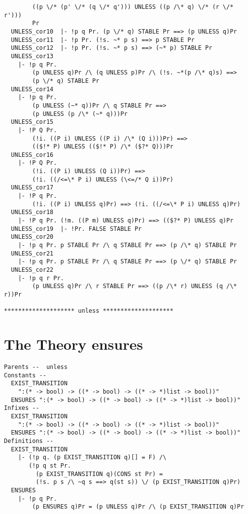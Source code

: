 {\begin{verbatim}
        ((p \/* (p' \/* (q \/* q'))) UNLESS ((p /\* q) \/* (r \/* r')))
        Pr
  UNLESS_cor10  |- !p q Pr. (p \/* q) STABLE Pr ==> (p UNLESS q)Pr
  UNLESS_cor11  |- !p Pr. (!s. ~* p s) ==> p STABLE Pr
  UNLESS_cor12  |- !p Pr. (!s. ~* p s) ==> (~* p) STABLE Pr
  UNLESS_cor13
    |- !p q Pr.
        (p UNLESS q)Pr /\ (q UNLESS p)Pr /\ (!s. ~*(p /\* q)s) ==>
        (p \/* q) STABLE Pr
  UNLESS_cor14
    |- !p q Pr.
        (p UNLESS (~* q))Pr /\ q STABLE Pr ==>
        (p UNLESS (p /\* (~* q)))Pr
  UNLESS_cor15
    |- !P Q Pr.
        (!i. ((P i) UNLESS ((P i) /\* (Q i)))Pr) ==>
        (($!* P) UNLESS (($!* P) /\* ($?* Q)))Pr
  UNLESS_cor16
    |- !P Q Pr.
        (!i. ((P i) UNLESS (Q i))Pr) ==>
        (!i. ((/<=\* P i) UNLESS (\<=/* Q i))Pr)
  UNLESS_cor17
    |- !P q Pr.
        (!i. ((P i) UNLESS q)Pr) ==> (!i. ((/<=\* P i) UNLESS q)Pr)
  UNLESS_cor18
    |- !P q Pr. (!m. ((P m) UNLESS q)Pr) ==> (($?* P) UNLESS q)Pr
  UNLESS_cor19  |- !Pr. FALSE STABLE Pr
  UNLESS_cor20
    |- !p q Pr. p STABLE Pr /\ q STABLE Pr ==> (p /\* q) STABLE Pr
  UNLESS_cor21
    |- !p q Pr. p STABLE Pr /\ q STABLE Pr ==> (p \/* q) STABLE Pr
  UNLESS_cor22
    |- !p q r Pr.
        (p UNLESS q)Pr /\ r STABLE Pr ==> ((p /\* r) UNLESS (q /\* r))Pr
  
******************** unless ********************
\end{verbatim}

\section*{The Theory ensures}

\begin{verbatim}
Parents --  unless     
Constants --
  EXIST_TRANSITION
    ":(* -> bool) -> ((* -> bool) -> ((* -> *)list -> bool))"
  ENSURES ":(* -> bool) -> ((* -> bool) -> ((* -> *)list -> bool))"     
Infixes --
  EXIST_TRANSITION
    ":(* -> bool) -> ((* -> bool) -> ((* -> *)list -> bool))"
  ENSURES ":(* -> bool) -> ((* -> bool) -> ((* -> *)list -> bool))"     
Definitions --
  EXIST_TRANSITION
    |- (!p q. (p EXIST_TRANSITION q)[] = F) /\
       (!p q st Pr.
         (p EXIST_TRANSITION q)(CONS st Pr) =
         (!s. p s /\ ~q s ==> q(st s)) \/ (p EXIST_TRANSITION q)Pr)
  ENSURES
    |- !p q Pr.
        (p ENSURES q)Pr = (p UNLESS q)Pr /\ (p EXIST_TRANSITION q)Pr
  

\end{verbatim}}

